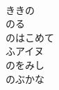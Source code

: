 \documentclass[10pt,b5j]{tarticle} %
\begin{document}
\begin{enumerate}
\begin{minipage}[c]{\blocksize}
    \end{minipage}
    \begin{minipage}[c]{\blocksize}
        
        \vspace{\linespace}
        \item~\\
        ききの\\
        のる\\
        のはこめて\\
        ふアイヌ\\
        のをみし\\
        のぶかな
    
    \end{minipage}
\end{enumerate} %
\end{document}
